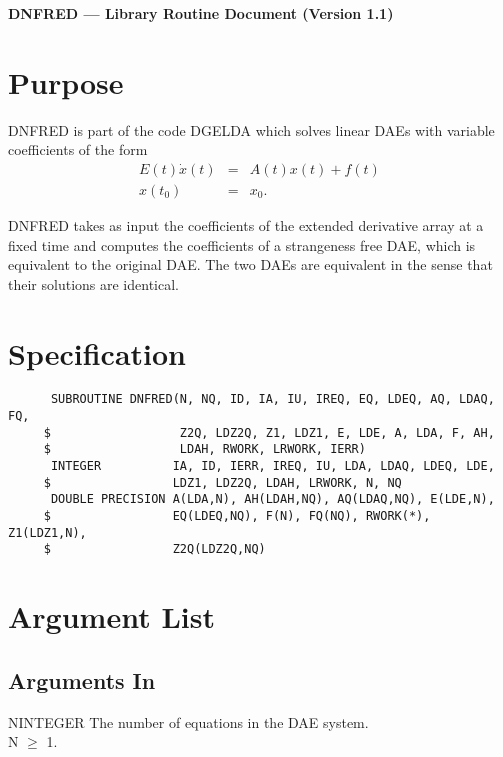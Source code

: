 


\begin{center}
  {\bf DNFRED --- Library Routine Document (Version 1.1)}
\end{center}

\section{Purpose}
DNFRED is part of the code DGELDA \cite{KunMRW95} which solves linear
DAEs with variable coefficients of the form 
\begin{eqnarray*}
  E(t)\dot{x}(t) &=& A(t)x(t) + f(t)\\
  x(t_0) &=& x_0.
\end{eqnarray*}

DNFRED takes as input the coefficients of the extended derivative
array at a fixed time and computes the coefficients of a strangeness
free DAE, which is equivalent to the original DAE. The two DAEs are
equivalent in the sense that their solutions are identical. 

\section{Specification}

\begin{verbatim}
      SUBROUTINE DNFRED(N, NQ, ID, IA, IU, IREQ, EQ, LDEQ, AQ, LDAQ, FQ, 
     $                  Z2Q, LDZ2Q, Z1, LDZ1, E, LDE, A, LDA, F, AH,
     $                  LDAH, RWORK, LRWORK, IERR)
      INTEGER          IA, ID, IERR, IREQ, IU, LDA, LDAQ, LDEQ, LDE, 
     $                 LDZ1, LDZ2Q, LDAH, LRWORK, N, NQ
      DOUBLE PRECISION A(LDA,N), AH(LDAH,NQ), AQ(LDAQ,NQ), E(LDE,N),
     $                 EQ(LDEQ,NQ), F(N), FQ(NQ), RWORK(*), Z1(LDZ1,N),
     $                 Z2Q(LDZ2Q,NQ) 
\end{verbatim}

\section{Argument List}

\subsection{Arguments In}

\begin{entry}{N}{INTEGER}
  The number of equations in the DAE system.\\
  N $\ge$ 1.
\end{entry}

